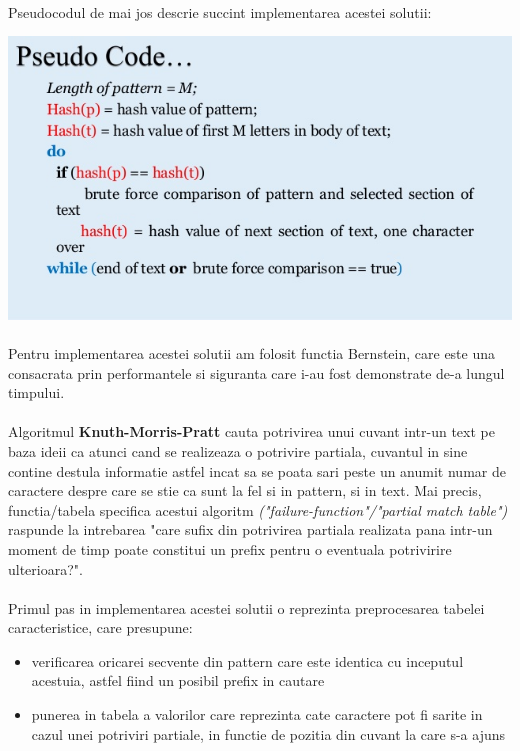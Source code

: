 \documentclass[runningheads]{llncs}
\begin{document}
\paragraph{} Pseudocodul de mai jos descrie succint implementarea acestei solutii: 
\begin{center}
\includegraphics[scale=0.4]{rbpseudo.jpg}
\end{center}
\paragraph{} Pentru implementarea acestei solutii am folosit functia Bernstein, care este una consacrata prin performantele si siguranta care i-au fost demonstrate de-a lungul timpului.

\paragraph{} Algoritmul \textbf{Knuth-Morris-Pratt} cauta potrivirea unui cuvant intr-un text pe baza ideii ca atunci cand se realizeaza o potrivire partiala, cuvantul in sine contine destula informatie astfel incat sa se poata sari peste un anumit numar de caractere despre care se stie ca sunt la fel si in pattern, si in text. Mai precis, functia/tabela specifica acestui algoritm \textit{("failure-function"/"partial match table")}  raspunde la intrebarea "care sufix din potrivirea partiala realizata pana intr-un moment de timp poate constitui un prefix pentru o eventuala potrivirire ulterioara?".
\paragraph{} Primul pas in implementarea acestei solutii o reprezinta preprocesarea tabelei caracteristice, care presupune:
\begin{itemize}
\item verificarea oricarei secvente din pattern care este identica cu inceputul acestuia, astfel fiind un posibil prefix in cautare
\item punerea in tabela a valorilor care reprezinta cate caractere pot fi sarite in cazul unei potriviri partiale, in functie de pozitia din cuvant la care s-a ajuns
\end{itemize}
\end{document}
